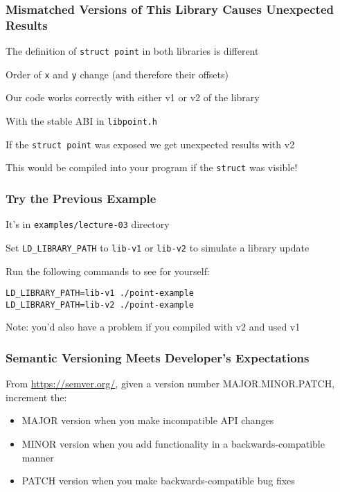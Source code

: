   \begin{frame}[fragile]
    \frametitle{Mismatched Versions of This Library Causes Unexpected Results}

    The definition of \texttt{struct point} in both libraries is different

    \hspace{2em} Order of \texttt{x} and \texttt{y} change (and therefore their offsets)

    \vspace{2em}

    Our code works correctly with either v1 or v2 of the library

    \hspace{2em} With the stable ABI in \lstinline|libpoint.h|

    \vspace{2em}

    If the \texttt{struct point} was exposed we get unexpected results with v2

    \hspace{2em} This would be compiled into your program if the \texttt{struct}
    was visible!
  \end{frame}

  \begin{frame}[fragile]
    \frametitle{Try the Previous Example}

    It's in \lstinline|examples/lecture-03| directory

    \vspace{2em}

    Set \texttt{LD\_LIBRARY\_PATH} to \lstinline|lib-v1| or \lstinline|lib-v2|
    to  simulate a library update

    \vspace{2em}

    Run the following commands to see for yourself:
    \begin{lstlisting}[commentstyle={}, xleftmargin=2em]
LD_LIBRARY_PATH=lib-v1 ./point-example
LD_LIBRARY_PATH=lib-v2 ./point-example
    \end{lstlisting}

    \vspace{2em}

    Note: you'd also have a problem if you compiled with v2 and used v1
  \end{frame}

  \begin{frame}
    \frametitle{Semantic Versioning Meets Developer's Expectations}

    From \url{https://semver.org/}, given a version number MAJOR.MINOR.PATCH,
    increment the:

    \begin{itemize}
      \item MAJOR version when you make incompatible API changes
      \item MINOR version when you add functionality in a backwards-compatible
            manner
      \item PATCH version when you make backwards-compatible bug fixes
    \end{itemize}
  \end{frame}


